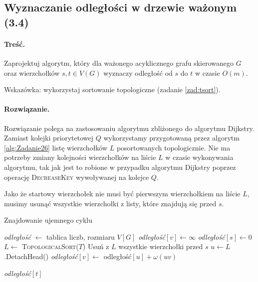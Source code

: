 \subsection{Wyznaczanie odległości w drzewie ważonym (3.4)}
\paragraph{Treść.}Zaprojektuj algorytm, który dla ważonego 
acyklicznego grafu skierowanego $G$ oraz wierzchołków $s, t \in
V(G)$ wyznaczy odległość od $s$ do $t$ w czasie $O(m)$. 

Wskazówka: wykorzystaj sortowanie topologiczne (zadanie \ref{zad:tsort}).

\paragraph{Rozwiązanie.}
Rozwiązanie polega na zastosowaniu algorytmu zbliżonego do
algorytmu Dijkstry. Zamiast 
kolejki priorytetowej $Q$ wykorzystamy przygotowaną przez algorytm 
\ref{alg:Zadanie26} listę wierzchołków $L$ posortowanych topologicznie.
Nie ma potrzeby zmiany kolejności wierzchołków na liście $L$ w czasie 
wykonywania algorytmu, tak jak jest to robione w przypadku algorytmu
Dijkstry poprzez operację \textsc{DecreaseKey} wywoływanej na kolejce $Q$.

Jako że startowy wierzchołek nie musi być pierwszym wierzchołkiem na liście $L$,
musimy usunąć wszystkie wierzchołki z listy, które znajdują się przed $s$.

\begin{algorithm}[H]
	\caption{Znajdowanie ujemnego cyklu}
	\begin{algorithmic}[1]
		\State \textit{odległość} $\gets$ tablica liczb, rozmiaru $V[G]$
		\State \textit{odległość}$[v] \gets \infty$
		\EndFor
		\State \textit{odległość}$[s] \gets 0$
		\State $L \gets$ \textsc{TopologicalSort}($T$) 
		\State Usuń z $L$ wszystkie wierzchołki przed $s$
		\State $u \gets L$.DetachHead()
		\State \textit{odległość}$[v] \gets $ {odległość}$[u] + \omega(uv)$

		\EndIf
		\EndFor
		\EndWhile
		\State \Return \textit{odległość}$[t]$
		\EndProcedure
	\end{algorithmic}
	\label{Zadanie34}
\end{algorithm}

